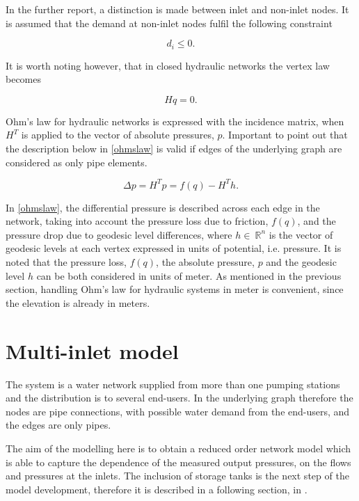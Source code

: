 In the further report, a distinction is made between inlet and non-inlet nodes. It is assumed that the demand at non-inlet nodes fulfil the following constraint

\begin{equation}
  \label{non_inlet_constraint}
  d_i \leq 0.
\end{equation}

It is worth noting however, that in closed hydraulic networks the vertex law becomes

\begin{equation}
  \label{vertexlaw_closed}
  Hq = 0.
\end{equation}

Ohm's law for hydraulic networks is expressed with the incidence matrix, when $H^T$ is applied to the vector of absolute pressures, $p$. Important to point out that the description below in \eqref{ohmslaw} is valid if edges of the underlying graph are considered as only pipe elements.

\begin{equation}
  \label{ohmslaw}
  \Delta p = H^Tp = f(q) - H^Th.
\end{equation}

In \eqref{ohmslaw}, the differential pressure is described across each edge in the network, taking into account the pressure loss due to friction, $f(q)$, and the pressure drop due to geodesic level differences,  where $h \in \: \mathbb{R}^{n}$ is the vector of geodesic levels at each vertex expressed in units of potential, i.e. pressure. It is noted that the pressure loss, $f(q)$, the absolute pressure, $p$  and the geodesic level $h$ can be both considered in units of meter. As mentioned in the previous section, handling Ohm's law for hydraulic systems in meter is convenient, since the elevation is already in meters.


\section{Multi-inlet model}
\label{multi_inlet_reduced_network_description}

The system is a water network supplied from more than one pumping stations and the distribution is to several end-users. In the underlying graph therefore the nodes are pipe connections, with possible water demand from the end-users, and the edges are only pipes. 

The aim of the modelling here is to obtain a reduced order network model which is able to capture the dependence of the measured output pressures, on the flows and pressures at the inlets. The inclusion of storage tanks is the next step of the model development, therefore it is described in a following section, in . 

